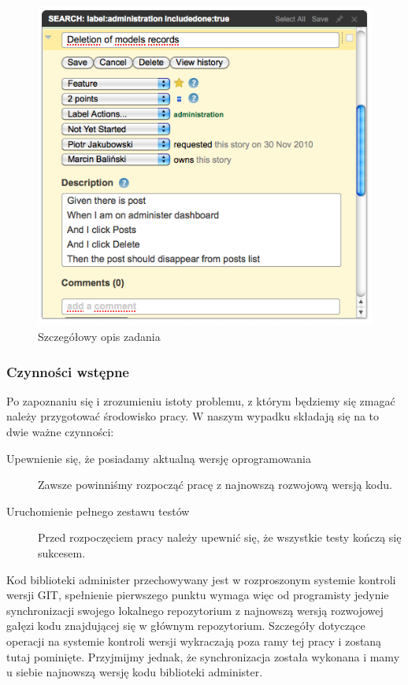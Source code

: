     \begin{figure}[h]
  		\begin{center}
  			\includegraphics[width=\linewidth]{images/administer_story_desc.png}
  			\caption{Szczegółowy opis zadania}
  			\label{administer_story_desc}
  		\end{center}
  	\end{figure}
  	
  	\subsubsection{Czynności wstępne}
  	
  	Po zapoznaniu się i zrozumieniu istoty problemu, z którym będziemy się zmagać należy przygotować środowisko pracy. W naszym wypadku składają się na to dwie ważne czynności:
  	
  	 \begin{description}
        \item[Upewnienie się, że posiadamy aktualną wersję oprogramowania] Zawsze powinniśmy rozpocząć pracę z najnowszą rozwojową wersją kodu.
        \item[Uruchomienie pełnego zestawu testów] Przed rozpoczęciem pracy należy upewnić się, że wszystkie testy kończą się sukcesem.
      \end{description}
      
    Kod biblioteki administer przechowywany jest w rozproszonym systemie kontroli wersji GIT, spełnienie pierwszego punktu wymaga więc od programisty jedynie synchronizacji swojego lokalnego repozytorium z najnowszą wersją rozwojowej gałęzi kodu znajdującej się w głównym repozytorium. Szczegóły dotyczące operacji na systemie kontroli wersji wykraczają poza ramy tej pracy i zostaną tutaj pominięte. Przyjmijmy jednak, że synchronizacja została wykonana i mamy u siebie najnowszą wersję kodu biblioteki administer. 
    

